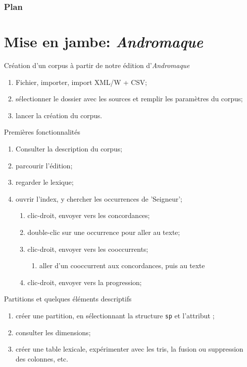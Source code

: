 \documentclass{beamer}
\begin{document}
\begin{frame} 
  \frametitle{Plan} 
  \tableofcontents
\end{frame}

\section{Mise en jambe: \textit{Andromaque}}

\begin{frame}{Création d'un corpus à partir de notre édition d'\textit{Andromaque}}

\begin{enumerate}
	\item Fichier, importer, import XML/W + CSV;
	\item sélectionner le dossier avec les sources et remplir les paramètres du corpus;
	\item lancer la création du corpus.
\end{enumerate}

\end{frame}

\begin{frame}{Premières fonctionnalités}
\begin{enumerate}
\item Consulter la description du corpus;
\item parcourir l'édition;
\item regarder le lexique;
\item ouvrir l'index, y chercher les occurrences de 'Seigneur';
	\begin{enumerate}
		\item clic-droit, envoyer vers les concordances;
		\item double-clic sur une occurrence pour aller au texte;
		\item clic-droit, envoyer vers les cooccurrents;
			\begin{enumerate}
				\item aller d'un cooccurrent aux concordances, puis au texte
			\end{enumerate}
		\item clic-droit, envoyer vers la progression;
	\end{enumerate}
\end{enumerate}

\end{frame}

\begin{frame}{Partitions et quelques éléments descriptifs}
\begin{enumerate}
\item créer une partition, en sélectionnant la structure \texttt{sp} et l'attribut \texttt{\@who};
\item consulter les dimensions;
\item créer une table lexicale, expérimenter avec les tris, la fusion ou suppression des colonnes, etc.
\end{enumerate}
\end{frame}
\end{document}
